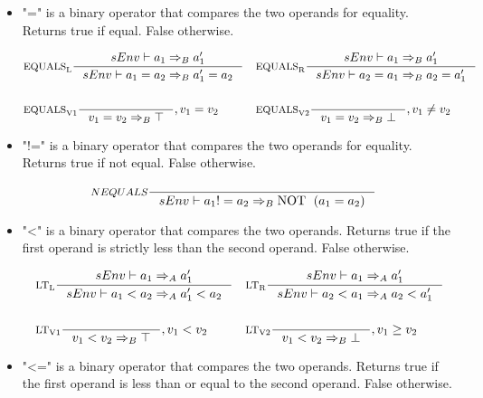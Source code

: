 \begin{itemize}
\item "=" is a binary operator that compares the two operands for equality. Returns true if equal. False otherwise.

\begin{align*}
&\inference[$\text{EQUALS}_\text{L}$]{sEnv \vdash a_1 \Rightarrow_B a_1'}
                    {sEnv \vdash a_1 = a_2 \Rightarrow_B a_1' = a_2}
&
&\inference[$\text{EQUALS}_\text{R}$]{sEnv \vdash a_1 \Rightarrow_B a_1'}
                    {sEnv \vdash a_2 = a_1 \Rightarrow_B a_2 = a_1'}
\\\\
&\inference[$\text{EQUALS}_\text{V1}$]{}
                    {v_1 = v_2 \Rightarrow_B \top}
                    {, v_1 = v_2}
&
&\inference[$\text{EQUALS}_\text{V2}$]{}
                    {v_1 = v_2 \Rightarrow_B \bot}
                    {, v_1 \neq v_2}
\end{align*}

\item "!=" is a binary operator that compares the two operands for equality. Returns true if not equal. False otherwise.

\begin{align*}
&\inference[$NEQUALS$]{}
                    {sEnv \vdash a_1 != a_2 \Rightarrow_B \Tnot (a_1 = a_2)}
\end{align*}

\item "<" is a binary operator that compares the two operands. Returns true if the first operand is strictly less than the second operand. False otherwise.

\begin{align*}
&\inference[$\text{LT}_\text{L}$]{sEnv \vdash a_1 \Rightarrow_A a_1'}
                    {sEnv \vdash a_1 < a_2 \Rightarrow_A a_1' < a_2}
&
&\inference[$\text{LT}_\text{R}$]{sEnv \vdash a_1 \Rightarrow_A a_1'}
                    {sEnv \vdash a_2 < a_1 \Rightarrow_A a_2 < a_1'}
\\\\
&\inference[$\text{LT}_\text{V1}$]{}
                    {v_1 < v_2 \Rightarrow_B \top}
                    {, v_1 < v_2}
&
&\inference[$\text{LT}_\text{V2}$]{}
                    {v_1 < v_2 \Rightarrow_B \bot}
                    {, v_1 \geq v_2}
\end{align*}

\item "<=" is a binary operator that compares the two operands. Returns true if the first operand is less than or equal to the second operand. False otherwise.


\end{itemize}
